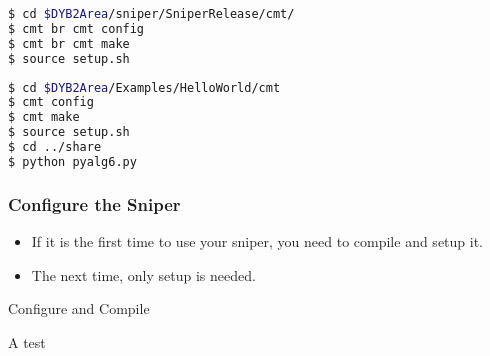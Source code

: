 \newsavebox{\installsniper}
\begin{lrbox}{\installsniper}
\begin{lstlisting}[language=bash]
$ cd $DYB2Area/sniper/SniperRelease/cmt/
$ cmt br cmt config
$ cmt br cmt make
$ source setup.sh
\end{lstlisting}
\end{lrbox}
\newsavebox{\testsniper}
\begin{lrbox}{\testsniper}
\begin{lstlisting}[language=bash]
$ cd $DYB2Area/Examples/HelloWorld/cmt
$ cmt config
$ cmt make
$ source setup.sh
$ cd ../share
$ python pyalg6.py
\end{lstlisting}
\end{lrbox}

\begin{frame}
    \frametitle{Configure the Sniper}
    \begin{itemize}
        \item If it is the first time to 
                use your sniper, you need to
                compile and setup it.
        \item The next time, only setup is needed.
    \end{itemize}
    \begin{block}{Configure and Compile}
        \par\usebox{\installsniper}
    \end{block}
    \begin{block}{A test}
        \par\usebox{\testsniper}
    \end{block}
\end{frame}

